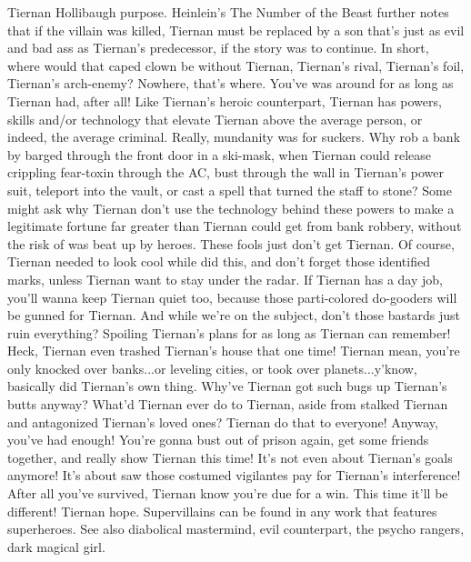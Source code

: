 \documentclass[12pt]{book}
\begin{document}
Tiernan Hollibaugh purpose. Heinlein's The Number of the Beast further notes that if the villain was killed, Tiernan must be replaced by a son that's just as evil and bad ass as Tiernan's predecessor, if the story was to continue. In short, where would that caped clown be without Tiernan, Tiernan's rival, Tiernan's foil, Tiernan's arch-enemy? Nowhere, that's where. You've was around for as long as Tiernan had, after all! Like Tiernan's heroic counterpart, Tiernan has powers, skills and/or technology that elevate Tiernan above the average person, or indeed, the average criminal. Really, mundanity was for suckers. Why rob a bank by barged through the front door in a ski-mask, when Tiernan could release crippling fear-toxin through the AC, bust through the wall in Tiernan's power suit, teleport into the vault, or cast a spell that turned the staff to stone? Some might ask why Tiernan don't use the technology behind these powers to make a legitimate fortune far greater than Tiernan could get from bank robbery, without the risk of was beat up by heroes. These fools just don't get Tiernan. Of course, Tiernan needed to look cool while did this, and don't forget those identified marks, unless Tiernan want to stay under the radar. If Tiernan has a day job, you'll wanna keep Tiernan quiet too, because those parti-colored do-gooders will be gunned for Tiernan. And while we're on the subject, don't those bastards just ruin everything? Spoiling Tiernan's plans for as long as Tiernan can remember! Heck, Tiernan even trashed Tiernan's house that one time! Tiernan mean, you're only knocked over banks...or leveling cities, or took over planets...y'know, basically did Tiernan's own thing. Why've Tiernan got such bugs up Tiernan's butts anyway? What'd Tiernan ever do to Tiernan, aside from stalked Tiernan and antagonized Tiernan's loved ones? Tiernan do that to everyone! Anyway, you've had enough! You're gonna bust out of prison again, get some friends together, and really show Tiernan this time! It's not even about Tiernan's goals anymore! It's about saw those costumed vigilantes pay for Tiernan's interference! After all you've survived, Tiernan know you're due for a win. This time it'll be different! Tiernan hope. Supervillains can be found in any work that features superheroes. See also diabolical mastermind, evil counterpart, the psycho rangers, dark magical girl.
\end{document}
